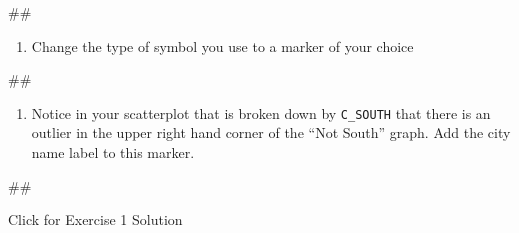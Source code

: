 \documentclass[
]{book}
\newenvironment{Shaded}{\begin{snugshade}}{\end{snugshade}}
\newcommand{\NormalTok}[1]{#1}
\providecommand{\tightlist}{%
  \setlength{\itemsep}{0pt}\setlength{\parskip}{0pt}}
\begin{document}
\begin{Shaded}
\begin{Highlighting}[]
\NormalTok{\#\#}
\end{Highlighting}
\end{Shaded}

\begin{enumerate}
\def\labelenumi{\arabic{enumi}.}
\setcounter{enumi}{4}
\tightlist
\item
  Change the type of symbol you use to a marker of your choice
\end{enumerate}

\begin{Shaded}
\begin{Highlighting}[]
\NormalTok{\#\#}
\end{Highlighting}
\end{Shaded}

\begin{enumerate}
\def\labelenumi{\arabic{enumi}.}
\setcounter{enumi}{5}
\tightlist
\item
  Notice in your scatterplot that is broken down by \texttt{C\_SOUTH} that there is an outlier in the upper right hand corner of the ``Not South'' graph. Add the city name label to this marker.
\end{enumerate}

\begin{Shaded}
\begin{Highlighting}[]
\NormalTok{\#\#}
\end{Highlighting}
\end{Shaded}

{Click for Exercise 1 Solution}
\end{document}
